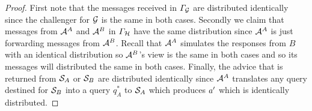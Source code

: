 \begin{proof}
  First note that the messages received in $\varGamma_{\mathcal{G}}$ are distributed identically since the challenger for $\mathcal{G}$ is the same in both cases.
  Secondly we claim that messages from $\mathcal{A}^{A}$ and $\mathcal{A}^{B}$ in $\varGamma_{\mathcal{H}}$ have the same distribution since $\mathcal{A}^{A}$ is just forwarding messages from $\mathcal{A}^{B}$.
  Recall that $\mathcal{A}^{A}$ simulates the responses from $B$ with an identical distribution so $\mathcal{A}^{B}$'s view is the same in both cases and so its messages will distributed the same in both cases.
  Finally, the advice that is returned from $\mathcal{S}_{A}$ or $\mathcal{S}_{B}$ are distributed identically since $\mathcal{A}^{A}$ translates any query destined for $\mathcal{S}_{B}$ into a query $q_{A}^{*}$ to $\mathcal{S}_{A}$ which produces $a'$ which is identically distributed.
\end{proof}
